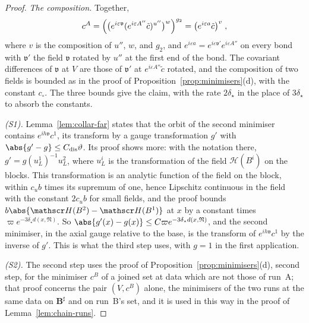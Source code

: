 \begin{proof}
\emph{The composition.} Together,
\[
    c^A = \Bigl(\bigl(e^{i\varepsilon\mathfrak v}(e^{i\varepsilon A''}\tilde c)^{u''}\bigr)^w\Bigr)^{g_2} = \bigl(e^{i\varepsilon a}\tilde c\bigr)^v\;,
\]
where $v$ is the composition of $u''$, $w$, and $g_2$, and $e^{i\varepsilon a} = e^{i\varepsilon\mathfrak v'}e^{i\varepsilon A''}$ on every bond with $\mathfrak v'$ the field $\mathfrak v$ rotated by $u''$ at the first end of the bond. The covariant differences of $\mathfrak v$ at $V$ are those of $\mathfrak v'$ at $e^{i\varepsilon A''}\tilde c$ rotated, and the composition of two fields is bounded as in the proof of Proposition~\ref{prop:minimisers}(d), with the constant $c_\circ$. The three bounds give the claim, with the rate $2\delta_\star$ in the place of $3\delta_\star$ to absorb the constants.

\emph{(S1).} Lemma~\ref{lem:collar-far} states that the orbit of the second minimiser contains $e^{ih\mathfrak v}c^1$, its transform by a gauge transformation $g'$ with $\abs{g' - g} \leq C_{\mathrm{dis}}\vartheta$. Its proof shows more: with the notation there, $g' = g(u^1_L)^{-1}u^2_L$, where $u^i_L$ is the transformation \cite[(106)]{BalabanAVG} of the field $\mathscr H(B^i)$ on the blocks. This transformation is an analytic function of the field on the block, within $c_ub$ times its supremum of one, hence Lipschitz continuous in the field with the constant $2c_ub$ for small fields, and the proof bounds $b\abs{\mathscr H(B^2) - \mathscr H(B^1)}$ at $x$ by a constant times $\varpi e^{-3\delta_\star d(x,\mathfrak N)}$. So $\abs{g'(x) - g(x)} \leq C\varpi e^{-3\delta_\star d(x,\mathfrak N)}$, and the second minimiser, in the axial gauge relative to the base, is the transform of $e^{ih\mathfrak v}c^1$ by the inverse of $g'$. This is what the third step uses, with $g = 1$ in the first application.

\emph{(S2).} The second step uses the proof of Proposition~\ref{prop:minimisers}(d), second step, for the minimiser $c^B$ of a joined set at data which are not those of run~A; that proof concerns the pair $(V, c^B)$ alone, the minimisers of the two runs at the same data on $\mathbf B^\sharp$ and on run~B's set, and it is used in this way in the proof of Lemma~\ref{lem:chain-runs}.
\end{proof}

